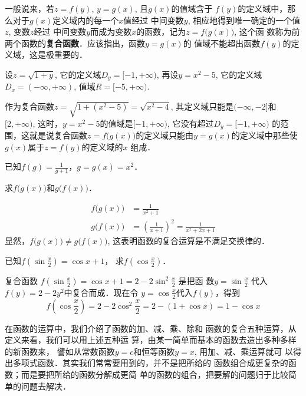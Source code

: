 一般说来，若$z=f(y)$, $y=g(x)$, 且$g(x)$的值域含于
$f(y)$的定义域中，那么对于$g(x)$定义域内的每一个$x$值经过
中间变数$y$, 相应地得到唯一确定的一个值$z$, 变数$z$经过
中间变数$y$而成为变数$x$的函数，记为$z=f\big(g(x)\big)$, 这个函
数称为前两个函数的\textbf{复合函数}．应该指出，函数$y=g(x)$的
值域不能超出函数$f(y)$的定义域，这是极重要的．


\begin{example}
    设$z=\sqrt{1+y}$, 它的定义域$D_y=[-1,+\infty)$,
再设$y=x^2-5$, 它的定义域$D_x=(-\infty,+\infty)$, 值域$R=
[-5,+\infty)$. 

作为复合函数$z=\sqrt{1+(x^2-5)}=\sqrt{x^2-4}$,
其定义域只能是$(-\infty,-2]$和$[2,+\infty)$, 这时，$y=x^2-
5$的值域是$[-1,+\infty)$, 它没有超过$D_y=[-1,+\infty)$
的范围，这就是说复合函数$z=f\big(g(x)\big)$的定义域只能由$y=
g(x)$的定义域中那些使$g(x)$属于$z=f(y)$的定义域的$x$
组成．
\end{example}

\begin{example}
已知$f(g)=\frac{1}{g+1}$，$g=g(x)=x^2$．

求$f\big(g(x)\big)$和$g\big(f(x)\big)$．    
\end{example}

\begin{solution}
\[\begin{split}
    f\big(g(x)\big)&=\frac{1}{x^2+1}\\
    g\big(f(x)\big)&=\left(\frac{1}{x+1}\right)^2=\frac{1}{x^2+2x+1}
\end{split}\]
显然，$f\big(g(x)\big)\ne g\big(f(x)\big)$, 这表明函数的复合运算是不满足交换律的．
\end{solution}

\begin{example}
已知$f\left(\sin\frac{x}{2}\right)=\cos x+1$，
求$f\left(\cos\frac{x}{2}\right)$．
\end{example}    

\begin{solution}
    复合函数
$f\left(\sin\frac{x}{2}\right)=\cos x+1=2-2\sin^2\frac{x}{2}$
    是把函
    数$y=\sin\frac{x}{2}$
    代入$f(y)=2-2y^2$中复合而成．现在令
    $y=\cos\frac{x}{2}$代入$f(y)$，得到
\[f\left(\cos\frac{x}{2}\right)=2-2\cos^2\frac{x}{2}=2-(1+\cos x)=1-\cos x\]
\end{solution}    

在函数的运算中，我们介绍了函数的加、减、乘、除和
函数的复合五种运算，从定义来看，我们可以用上述五种运
算，由某一简单而基本的函数去造出多种多样的新函数来，
譬如从常数函数$y=c$和恒等函数$y=x$, 用加、减、乘运算就可
以得出多项式函数．其实我们常常要用到的，并不是把所给的
函数组合成更复杂的函数；而是要把所给的函数分解成更简
单的函数的组合，把要解的问题归于比较简单的问题去解决．


